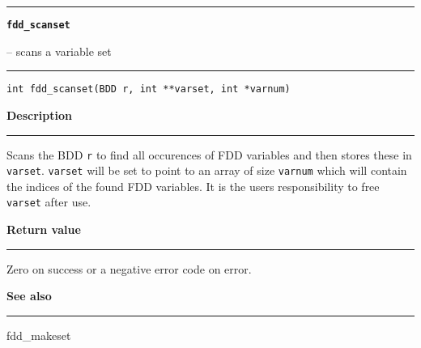 \begin{minipage}{\textwidth}

\noindent\begin{minipage}{\textwidth}
\rule{\textwidth}{0.5mm}
{\tt\bf fdd\_scanset }
\--- scans a variable set  \hspace{\fill}
\\\rule[1.5ex]{\textwidth}{0.5mm}
\end{minipage}

\noindent\begin{verbatim}
int fdd_scanset(BDD r, int **varset, int *varnum) 
\end{verbatim}

\vspace{\parsep}\noindent
{\bf Description}\\\rule[1.5ex]{\textwidth}{0.2mm}\vspace{-1.5ex}\setlength{\parindent}{1em}
Scans the BDD {\tt r} to find all occurences of FDD variables
           and then stores these in {\tt varset}. {\tt varset} will be set
	   to point to an array of size {\tt varnum} which will contain
	   the indices of the found FDD variables. It is the users
	   responsibility to free {\tt varset} after use. 

\setlength{\parindent}{0em}\vspace{\parsep}\vspace{\baselineskip}\noindent
{\bf Return value}\\\rule[1.5ex]{\textwidth}{0.2mm}\vspace{-1.5ex}
Zero on success or a negative error code on error. 

\vspace{\parsep}\vspace{\baselineskip}\noindent
{\bf See also}\\\rule[1.5ex]{\textwidth}{0.2mm}\vspace{-1.5ex}
fdd\_makeset 
\end{minipage}
\vspace{8ex}
